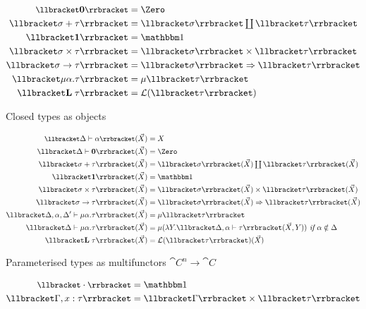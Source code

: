 \begin{figure}
\begin{subfigure}{0.5\linewidth}
  \begin{align*}
  \small
  \sem{\tyZero} &= \Zero
  \\
  \sem{\sigma \tySum \tau} &= \textstyle {\sem{\sigma}} \coprod {\sem{\tau}}
  \\
  \sem{\tyUnit} &= \One
  \\
  \sem{\sigma \tyProd \tau} &= \sem{\sigma} \times \sem{\tau}
  \\
  \sem{\sigma \tyFun \tau} &= \internalHom{\sem{\sigma}}{\sem{\tau}}
  \\
  \sem{\mu\alpha.\tau} &= \mu\sem{\tau}
  \\
  \sem{\tyLift\;\tau} &= \mathcal{L}(\sem{\tau})
  \end{align*}
  \caption{Closed types as objects}
\end{subfigure}%
\begin{subfigure}{0.5\linewidth}
  \begin{align*}
  \small
  \sem{\Delta \vdash \alpha}(\vec X) &= X
  \\
  \sem{\Delta \vdash \tyZero}(\vec X) &= \Zero
  \\
  \sem{\sigma \tySum \tau}(\vec X) &= \textstyle {\sem{\sigma}(\vec X)} \coprod {\sem{\tau}(\vec X)}
  \\
  \sem{\tyUnit}(\vec X) &= \One
  \\
  \sem{\sigma \tyProd \tau}(\vec X) &= \sem{\sigma}(\vec X) \times \sem{\tau}(\vec X)
  \\
  \sem{\sigma \tyFun \tau}(\vec X) &= \internalHom{\sem{\sigma}(\vec X)}{\sem{\tau}(\vec X)}
  \\
  \sem{\Delta, \alpha, \Delta' \vdash \mu\alpha.\tau}(\vec X) &= \mu\sem{\tau}
  \\
  \sem{\Delta \vdash \mu\alpha.\tau}(\vec X) &=
  \mu(\lambda Y.\sem{\Delta, \alpha \vdash \tau}(\vec X, Y))
  \textit{ if }\alpha \notin \Delta
  \\
  \sem{\tyLift\;\tau}(\vec X) &= \mathcal{L}(\sem{\tau})(\vec X)
  \end{align*}
  \caption{Parameterised types as multifunctors $\cat{C}^n \to \cat{C}$}
  \label{fig:default-semantics:types}
\end{subfigure}
\begin{subfigure}{\linewidth}
  \begin{align*}
  \small
  \sem{\emptyCxt} &= \One
  \\
  \sem{\Gamma, x: \tau} &= \sem{\Gamma} \times \sem{\tau}

\end{align*}
\end{subfigure}
\end{figure}
